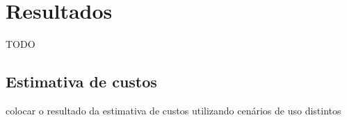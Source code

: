 
\chapter{Resultados}
\label{cap:resultados}

TODO

\section{Estimativa de custos}
\label{sec:estimativaDeCustos}

colocar o resultado da estimativa de custos utilizando cenários de uso distintos

